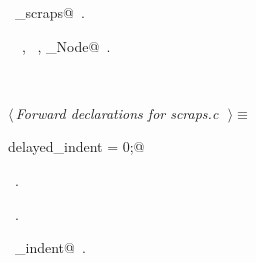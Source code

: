 \documentclass{report}
\begin{document}
\begin{flushleft}
\begin{minipage}{\linewidth}
\begin{list}{}{\setlength{\itemsep}{-\parsep}\setlength{\itemindent}{-\leftmargin}}
\end{list}
\vspace{-2ex}
\footnotesize\addtolength{\baselineskip}{-1ex}
\begin{list}{}{\setlength{\itemsep}{-\parsep}\setlength{\itemindent}{-\leftmargin}}
\item \NWtxtIdentsDefed\nobreak\  \verb@write_scraps@\nobreak\ .\end{list}
\vspace{-2ex}
\footnotesize\addtolength{\baselineskip}{-1ex}
\begin{list}{}{\setlength{\itemsep}{-\parsep}\setlength{\itemindent}{-\leftmargin}}
\item \NWtxtIdentsUsed\nobreak\  \verb@FILE@\nobreak\ , \verb@Parameters@\nobreak\ , \verb@Scrap_Node@\nobreak\ .\end{list}
\end{minipage}\\[4ex]
\end{flushleft}
\begin{flushleft} \small
\begin{minipage}{\linewidth} \label{scrap176}
$\langle\,${\it Forward declarations for scraps.c}\nobreak\ {\footnotesize {}}$\,\rangle\equiv$
\vspace{-1ex}
\begin{list}{}{} \item
\mbox{}\verb@int delayed_indent = 0;@\\
\mbox{}\verb@@{\NWsep}
\end{list}
\vspace{-1ex}
\footnotesize\addtolength{\baselineskip}{-1ex}
\begin{list}{}{\setlength{\itemsep}{-\parsep}\setlength{\itemindent}{-\leftmargin}}
\item \NWtxtMacroDefBy\ .
\item \NWtxtMacroRefIn\ .
\end{list}
\vspace{-2ex}
\footnotesize\addtolength{\baselineskip}{-1ex}
\begin{list}{}{\setlength{\itemsep}{-\parsep}\setlength{\itemindent}{-\leftmargin}}
\item \NWtxtIdentsDefed\nobreak\  \verb@delayed_indent@\nobreak\ .\end{list}
\end{minipage}\\[4ex]
\end{flushleft}
\end{document}
